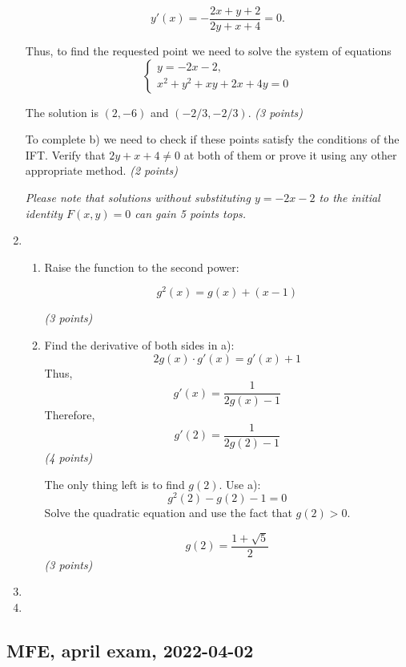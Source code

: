 \begin{enumerate}
    \[
      y'(x) = -\frac{2x+y+2}{2y+x+4} = 0.
    \] 
    
    Thus, to find the requested point we need to solve the system of equations 
    \[
    \begin{cases}
        y = -2x-2,\\
        x^2+y^2+xy+2x+4y = 0
    \end{cases}
    \]

The solution is $(2,-6)$ and $(-2/3,-2/3).$ \textit{(3 points)}

To complete b) we need to check if these points satisfy the conditions of the IFT. 
Verify that $2y + x +4 \neq 0$ at both of them or prove it using any other appropriate method. \textit{(2 points)} 
    
\textit{Please note that solutions without substituting $y = -2x-2$ to the initial identity $F(x,y) = 0$ can gain 5 points tops.}

\item

\begin{enumerate}
    \item Raise the function to the second power:
    
    \[
        g^2(x) = g(x) + (x-1)
    \]
    
    \textit{(3 points)}

    
    \item Find the derivative of both sides in a):
    \[
        2g(x)\cdot g'(x) = g'(x) + 1
    \]
    Thus, 
    \[
      g'(x) = \frac{1}{2g(x)-1}
    \]
    Therefore,
    \[
      g'(2) = \frac{1}{2g(2)-1}
    \]
    \textit{(4 points)}
    
    The only thing left is to find $g(2)$. Use a):
    \[
    g^2(2) - g(2) - 1 = 0
    \]
    Solve the quadratic equation and use the fact that $g(2) >0$.
    
    \[
      g(2) = \frac{1+\sqrt{5}}{2}
    \]
    \textit{(3 points)}
\end{enumerate}
    

    \item 
    \item 
\end{enumerate}



\subsection{MFE, april exam, 2022-04-02}

